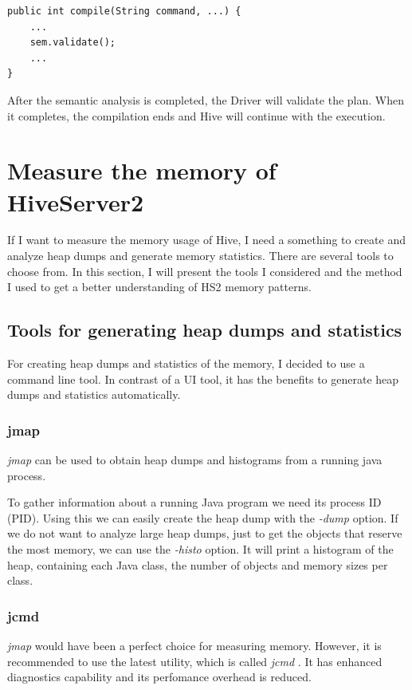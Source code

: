 \begin{lstlisting}
public int compile(String command, ...) {
	...
	sem.validate();
	...
}
\end{lstlisting}

After the semantic analysis is completed, the Driver will validate the plan. When it completes, the compilation ends and Hive will continue with the execution.

\clearpage
\section{Measure the memory of HiveServer2}
If I want to measure the memory usage of Hive, I need a something to create and analyze heap dumps and generate memory statistics. There are several tools to choose from. In this section, I will present the tools I considered and the method I used to get a better understanding of HS2 memory patterns.

\subsection{Tools for generating heap dumps and statistics}
For creating heap dumps and statistics of the memory, I decided to use a command line tool. In contrast of a UI tool, it has the benefits to generate heap dumps and statistics automatically. 

\subsubsection{jmap}
\textit{jmap} \cite{jmap} can be used to obtain heap dumps and histograms from a running java process.

To gather information about a running Java program we need its process ID (PID). Using this we can easily create the heap dump with the \textit{-dump} option. If we do not want to analyze large heap dumps, just to get the objects that reserve the most memory, we can use the \textit{-histo} option. It will print a histogram of the heap, containing each Java class, the number of objects and memory sizes per class.

\subsubsection{jcmd}
\textit{jmap} would have been a perfect choice for measuring memory. However, it is recommended to use the latest utility, which is called \textit{jcmd} \cite{jcmd}. It has enhanced diagnostics capability and its perfomance overhead is reduced. 


